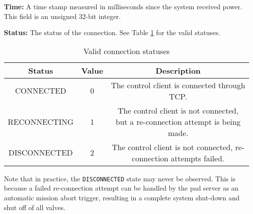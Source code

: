 \textbf{Time:} A time stamp measured in milliseconds since the system received power. This field is an unsigned 32-bit
integer.

\textbf{Status:} The status of the connection. See Table \ref{tbl:connection-statuses} for the valid statuses.

\begin{table}[H]
    \centering
    \begin{tabular}{| c | c | c |}
        \hline
        Status       & Value & Description                                                                     \\
        \hline
        CONNECTED    & 0     & The control client is connected through TCP.                                    \\
        \hline
        RECONNECTING & 1     & The control client is not connected, but a re-connection attempt is being made. \\
        \hline
        DISCONNECTED & 2     & The control client is not connected, re-connection attempts failed.             \\
        \hline
    \end{tabular}
    \caption{Valid connection statuses}
    \label{tbl:connection-statuses}
\end{table}

Note that in practice, the \texttt{DISCONNECTED} state may never be observed. This is because a failed re-connection
attempt can be handled by the pad server as an automatic mission abort trigger, resulting in a complete system
shut-down and shut off of all valves.

